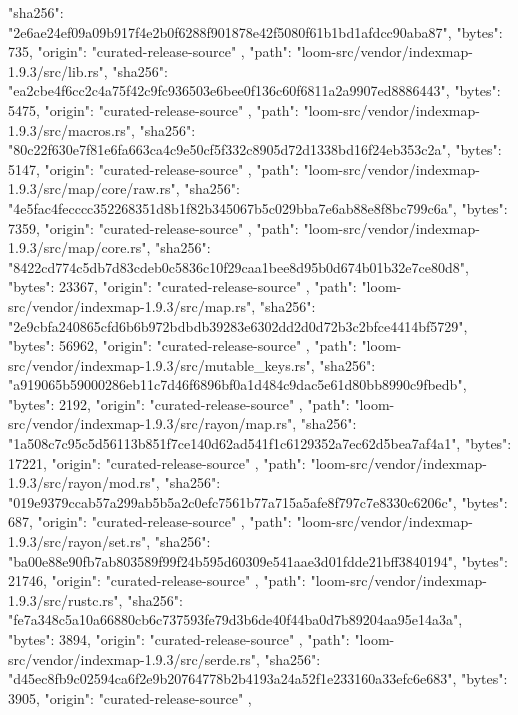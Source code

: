 {{      "sha256": "2e6ae24ef09a09b917f4e2b0f6288f901878e42f5080f61b1bd1afdcc90aba87",
      "bytes": 735,
      "origin": "curated-release-source"
    },
    {
      "path": "loom-src/vendor/indexmap-1.9.3/src/lib.rs",
      "sha256": "ea2cbe4f6cc2c4a75f42c9fc936503e6bee0f136c60f6811a2a9907ed8886443",
      "bytes": 5475,
      "origin": "curated-release-source"
    },
    {
      "path": "loom-src/vendor/indexmap-1.9.3/src/macros.rs",
      "sha256": "80c22f630e7f81e6fa663ca4c9e50cf5f332c8905d72d1338bd16f24eb353c2a",
      "bytes": 5147,
      "origin": "curated-release-source"
    },
    {
      "path": "loom-src/vendor/indexmap-1.9.3/src/map/core/raw.rs",
      "sha256": "4e5fac4fecccc352268351d8b1f82b345067b5c029bba7e6ab88e8f8bc799c6a",
      "bytes": 7359,
      "origin": "curated-release-source"
    },
    {
      "path": "loom-src/vendor/indexmap-1.9.3/src/map/core.rs",
      "sha256": "8422cd774c5db7d83cdeb0c5836c10f29caa1bee8d95b0d674b01b32e7ce80d8",
      "bytes": 23367,
      "origin": "curated-release-source"
    },
    {
      "path": "loom-src/vendor/indexmap-1.9.3/src/map.rs",
      "sha256": "2e9cbfa240865cfd6b6b972bdbdb39283e6302dd2d0d72b3c2bfce4414bf5729",
      "bytes": 56962,
      "origin": "curated-release-source"
    },
    {
      "path": "loom-src/vendor/indexmap-1.9.3/src/mutable_keys.rs",
      "sha256": "a919065b59000286eb11c7d46f6896bf0a1d484c9dac5e61d80bb8990c9fbedb",
      "bytes": 2192,
      "origin": "curated-release-source"
    },
    {
      "path": "loom-src/vendor/indexmap-1.9.3/src/rayon/map.rs",
      "sha256": "1a508c7c95c5d56113b851f7ce140d62ad541f1c6129352a7ec62d5bea7af4a1",
      "bytes": 17221,
      "origin": "curated-release-source"
    },
    {
      "path": "loom-src/vendor/indexmap-1.9.3/src/rayon/mod.rs",
      "sha256": "019e9379ccab57a299ab5b5a2c0efc7561b77a715a5afe8f797c7e8330c6206c",
      "bytes": 687,
      "origin": "curated-release-source"
    },
    {
      "path": "loom-src/vendor/indexmap-1.9.3/src/rayon/set.rs",
      "sha256": "ba00e88e90fb7ab803589f99f24b595d60309e541aae3d01fdde21bff3840194",
      "bytes": 21746,
      "origin": "curated-release-source"
    },
    {
      "path": "loom-src/vendor/indexmap-1.9.3/src/rustc.rs",
      "sha256": "fe7a348c5a10a66880cb6c737593fe79d3b6de40f44ba0d7b89204aa95e14a3a",
      "bytes": 3894,
      "origin": "curated-release-source"
    },
    {
      "path": "loom-src/vendor/indexmap-1.9.3/src/serde.rs",
      "sha256": "d45ec8fb9c02594ca6f2e9b20764778b2b4193a24a52f1e233160a33efc6e683",
      "bytes": 3905,
      "origin": "curated-release-source"
    },
}
